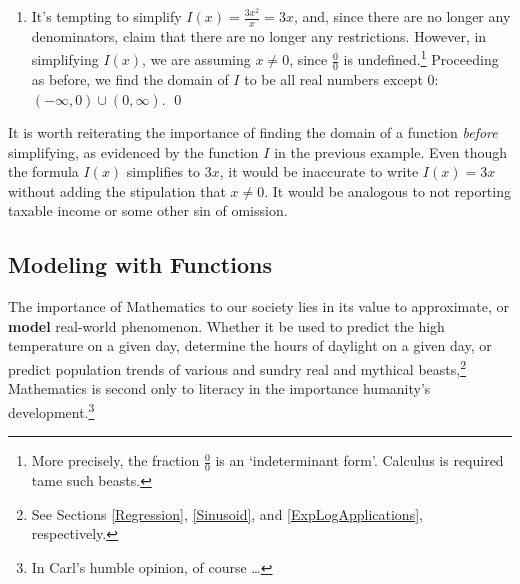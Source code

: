 \begin{ex}
\begin{enumerate}
\item  It's tempting to simplify $I(x) = \frac{3x^2}{x} = 3x$, and, since there are no longer any denominators, claim that there are no longer any restrictions.  However, in simplifying $I(x)$, we are assuming $x \neq 0$, since $\frac{0}{0}$ is undefined.\footnote{More precisely, the fraction $\frac{0}{0}$ is an `indeterminant form'.  Calculus is required tame such beasts.} Proceeding as before, we find the domain of $I$ to be all real numbers except $0$:  $(-\infty, 0) \cup (0, \infty)$.  \qed 

\end{enumerate}

\end{ex}

It is worth reiterating the importance of finding the domain of a function \emph{before} simplifying, as evidenced by the function $I$ in the previous example.  Even though the formula $I(x)$ simplifies to $3x$, it would be inaccurate to write $I(x) = 3x$ without adding the stipulation that $x \neq 0$. It would be analogous to not reporting taxable income or some other sin of omission.

\subsection{Modeling with Functions} \label{modeling}

The importance of Mathematics to our society lies in its value to approximate, or \textbf{model} real-world phenomenon.  Whether it be used to predict the high temperature on a given day, determine the hours of daylight on a given day, or predict population trends of various and sundry real and mythical beasts,\footnote{See Sections \ref{Regression}, \ref{Sinusoid}, and \ref{ExpLogApplications}, respectively.} Mathematics is second only to literacy in the importance humanity's development.\footnote{In Carl's humble opinion, of course \dots} 

\medskip

